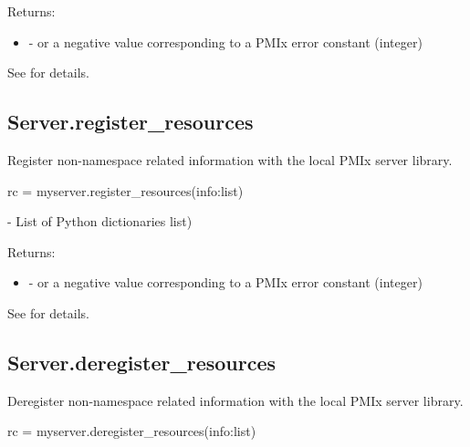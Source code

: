 Returns:

\begin{itemize}
    \item {} -  or a negative value corresponding to a PMIx error constant (integer)
\end{itemize}

See  for details.


\subsection{Server.register_resources}

\summary
Register non-namespace related information with the local \ac{PMIx} server library.

\format

\pyspecificstart
\begin{codepar}
rc = myserver.register_resources(info:list)
\end{codepar}
\pyspecificend


\begin{arglist}
 - List of Python  dictionaries list)
\end{arglist}

Returns:

\begin{itemize}
    \item {} -  or a negative value corresponding to a PMIx error constant (integer)
\end{itemize}

See  for details.


\subsection{Server.deregister_resources}

\summary
Deregister non-namespace related information with the local \ac{PMIx} server library.

\format

\pyspecificstart
\begin{codepar}
rc = myserver.deregister_resources(info:list)
\end{codepar}
\pyspecificend


